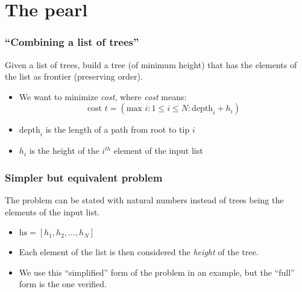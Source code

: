 \documentclass{beamer}
\begin{document}


    \begin{frame}
        \titlepage
    \end{frame}

    \section{The pearl}
    \label{sec:pearl}
        \begin{frame}
            \frametitle{``Combining a list of trees''}
            Given a list of trees, build a tree (of minimum height) that has
            the elements of the list as frontier (preserving order).

            \begin{itemize}
                \item We want to minimize \emph{cost}, where \emph{cost} means:
        \[
        \text{cost } t = (\text{max } i : 1 \leq i \leq N : \text{depth}_{i} + h_{i})
        \]
                \item $\text{depth}_{i}$ is the length of a path from root to tip $i$
                \item $h_{i}$ is the height of the $i^{th}$ element of the input list
            \end{itemize}
        \end{frame}

        \begin{frame}
            \frametitle{Simpler but equivalent problem}
            The problem can be stated with natural numbers instead of trees being
            the elements of the input list.

            \begin{itemize}
                \item $ \text{hs} = [h_{1}, h_{2}, \ldots, h_{N}] $
                \item Each element of the list is then considered the \emph{height}
                    of the tree.
                \item We use this ``simplified'' form of the problem in an example,
                    but the ``full'' form is the one verified.
            \end{itemize}
        \end{frame}
\end{document}
